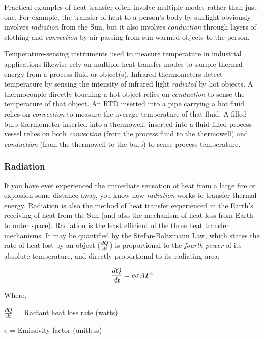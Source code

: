 Practical examples of heat transfer often involve multiple modes rather than just one.  For example, the transfer of heat to a person's body by sunlight obviously involves \textit{radiation} from the Sun, but it also involves \textit{conduction} through layers of clothing and \textit{convection} by air passing from sun-warmed objects to the person.  

Temperature-sensing instruments used to measure temperature in industrial applications likewise rely on multiple heat-transfer modes to sample thermal energy from a process fluid or object(s).  Infrared thermometers detect temperature by sensing the intensity of infrared light \textit{radiated} by hot objects.  A thermocouple directly touching a hot object relies on \textit{conduction} to sense the temperature of that object.  An RTD inserted into a pipe carrying a hot fluid relies on \textit{convection} to measure the average temperature of that fluid.  A filled-bulb thermometer inserted into a thermowell, inserted into a fluid-filled process vessel relies on both \textit{convection} (from the process fluid to the thermowell) and \textit{conduction} (from the thermowell to the bulb) to sense process temperature.




\filbreak
\subsubsection{Radiation}

If you have ever experienced the immediate sensation of heat from a large fire or explosion some distance away, you know how \textit{radiation} works to transfer thermal energy.  Radiation is also the method of heat transfer experienced in the Earth's receiving of heat from the Sun (and also the mechanism of heat loss from Earth to outer space).  Radiation is the least efficient of the three heat transfer mechanisms.  It may be quantified by the Stefan-Boltzmann Law, which states the rate of heat lost by an object ($dQ \over dt$) is proportional to the \textit{fourth power} of its absolute temperature, and directly proportional to its radiating area:     

$${dQ \over dt} = e \sigma A T^4$$

\noindent
Where,

$dQ \over dt$ = Radiant heat loss rate (watts)

$e$ = Emissivity factor (unitless)

